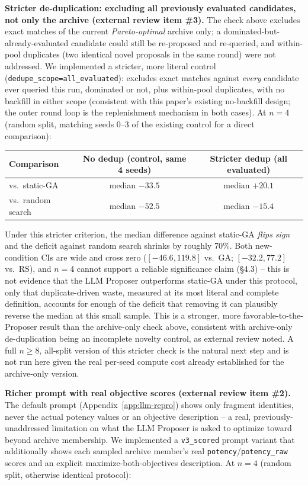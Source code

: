 \documentclass{article}
\begin{document}
\textbf{Stricter de-duplication: excluding all previously evaluated candidates, not only the archive (external review item \#3).} The check above excludes exact matches of the current \emph{Pareto-optimal} archive only; a dominated-but-already-evaluated candidate could still be re-proposed and re-queried, and within-pool duplicates (two identical novel proposals in the same round) were not addressed. We implemented a stricter, more literal control (\texttt{dedupe\_scope=all\_evaluated}): excludes exact matches against \emph{every} candidate ever queried this run, dominated or not, plus within-pool duplicates, with no backfill in either scope (consistent with this paper's existing no-backfill design; the outer round loop is the replenishment mechanism in both cases). At $n=4$ (random split, matching seeds 0--3 of the existing control for a direct comparison):

\begin{center}
\begin{tabular}{lcc}
\toprule
Comparison & No dedup (control, same 4 seeds) & Stricter dedup (all evaluated) \\
\midrule
vs.\ static-GA & median $-33.5$ & median $\mathbf{+20.1}$ \\
vs.\ random search & median $-52.5$ & median $-15.4$ \\
\bottomrule
\end{tabular}
\end{center}

Under this stricter criterion, the median difference against static-GA \emph{flips sign} and the deficit against random search shrinks by roughly 70\%. Both new-condition CIs are wide and cross zero ($[-46.6, 119.8]$ vs.\ GA; $[-32.2, 77.2]$ vs.\ RS), and $n=4$ cannot support a reliable significance claim (\S4.3) -- this is not evidence that the LLM Proposer outperforms static-GA under this protocol, only that duplicate-driven waste, measured at its most literal and complete definition, accounts for enough of the deficit that removing it can plausibly reverse the median at this small sample. This is a stronger, more favorable-to-the-Proposer result than the archive-only check above, consistent with archive-only de-duplication being an incomplete novelty control, as external review noted. A full $n\ge8$, all-split version of this stricter check is the natural next step and is not run here given the real per-seed compute cost already established for the archive-only version.

\textbf{Richer prompt with real objective scores (external review item \#2).} The default prompt (Appendix~\ref{app:llm-repro}) shows only fragment identities, never the actual potency values or an objective description -- a real, previously-unaddressed limitation on what the LLM Proposer is asked to optimize toward beyond archive membership. We implemented a \texttt{v3\_scored} prompt variant that additionally shows each sampled archive member's real \texttt{potency}/\texttt{potency\_raw} scores and an explicit maximize-both-objectives description. At $n=4$ (random split, otherwise identical protocol):
\end{document}
